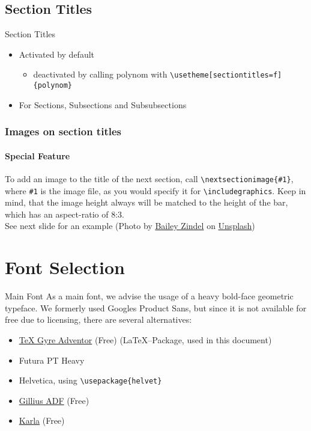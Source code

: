 \documentclass[fragile=singleslide]{beamer}
\begin{document}
\subsection{Section Titles}
\begin{frame}[fragile=singleslide]{Section Titles}
  \begin{itemize}
  \item Activated by default
    \begin{itemize}
    \item deactivated by calling polynom with \verb|\usetheme[sectiontitles=f]{polynom}|
    \end{itemize}
  \item For Sections, Subsections and Subsubsections
  \end{itemize}
\end{frame}

\begin{frame}[fragile=singleslide]
  \frametitle{Images on section titles}
  \framesubtitle{Special Feature}
  To add an image to the title of the next section, call
  \verb|\nextsectionimage{#1}|, where
  \verb|#1| is the image file, as you would specify it
  for \verb|\includegraphics|. Keep in mind, that the image height
  \alert{always} will be matched to the height of the bar, which has
  an aspect-ratio of 8:3.\\

  See next slide for an example (Photo by \href{https://unsplash.com/photos/NRQV-hBF10M}{Bailey Zindel} on \href{https://unsplash.com/}{Unsplash})
\end{frame}

\section{Font Selection}
\begin{frame}[fragile=singleslide]{Main Font}
  As a main font, we advise the usage of a heavy bold-face geometric typeface.  
  We formerly used Googles Product Sans, but since it is not available for free
  due to licensing, there are several alternatives:  
  \begin{itemize}
  \item \href{http://www.tug.dk/FontCatalogue/texgyreadventor/}{\TeX
      Gyre Adventor} (Free) (\LaTeX--Package, used in this document)
  \item Futura PT Heavy
  \item Helvetica, using \verb|\usepackage{helvet}|
  \item \href{https://www.1001fonts.com/gillius-adf-font.html}{Gillius
      ADF} (Free)
  \item \href{https://fonts.google.com/specimen/Karla}{Karla} (Free)
  \end{itemize}
\end{frame}
\end{document}
